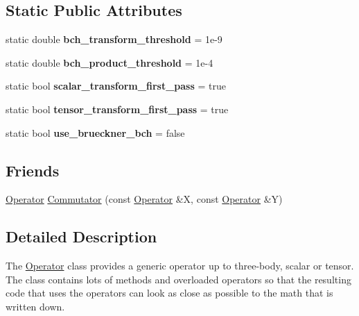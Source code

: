 \subsection*{Static Public Attributes}
\begin{DoxyCompactItemize}
\item 
static double {\bfseries bch\+\_\+transform\+\_\+threshold} = 1e-\/9\hypertarget{classOperator_af4743d3c6e99ebf1915b348447c8e688}{}\label{classOperator_af4743d3c6e99ebf1915b348447c8e688}

\item 
static double {\bfseries bch\+\_\+product\+\_\+threshold} = 1e-\/4\hypertarget{classOperator_ad4a2ba438f3286ef22cc06b61f745993}{}\label{classOperator_ad4a2ba438f3286ef22cc06b61f745993}

\item 
static bool {\bfseries scalar\+\_\+transform\+\_\+first\+\_\+pass} = true\hypertarget{classOperator_a0f4375a78d1a714eb1e13aad5ebf4508}{}\label{classOperator_a0f4375a78d1a714eb1e13aad5ebf4508}

\item 
static bool {\bfseries tensor\+\_\+transform\+\_\+first\+\_\+pass} = true\hypertarget{classOperator_a5e0d6cbbc5dc2bebae6f76fec38e6515}{}\label{classOperator_a5e0d6cbbc5dc2bebae6f76fec38e6515}

\item 
static bool {\bfseries use\+\_\+brueckner\+\_\+bch} = false\hypertarget{classOperator_a70e74e9e54e0f21a64c6ba8b1e476fdd}{}\label{classOperator_a70e74e9e54e0f21a64c6ba8b1e476fdd}

\end{DoxyCompactItemize}
\subsection*{Friends}
\begin{DoxyCompactItemize}
\item 
\hyperlink{classOperator}{Operator} \hyperlink{classOperator_a88b0cafa371bca287379a0ce89627e2b}{Commutator} (const \hyperlink{classOperator}{Operator} \&X, const \hyperlink{classOperator}{Operator} \&Y)
\end{DoxyCompactItemize}


\subsection{Detailed Description}
The \hyperlink{classOperator}{Operator} class provides a generic operator up to three-\/body, scalar or tensor. The class contains lots of methods and overloaded operators so that the resulting code that uses the operators can look as close as possible to the math that is written down. 

